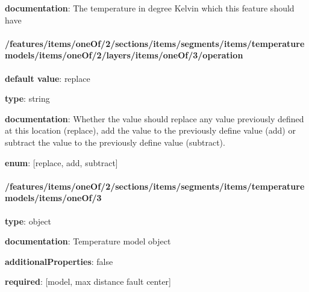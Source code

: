 \begin{itemized}
\item {\bf documentation}: The temperature in degree Kelvin which this feature should have
\end{itemized}\paragraph{/features/items/oneOf/2/sections/items/segments/items/temperature models/items/oneOf/2/layers/items/oneOf/3/operation} \begin{itemized}
\item {\bf default value}: replace
\item {\bf type}: string
\item {\bf documentation}: Whether the value should replace any value previously defined at this location (replace), add the value to the previously define value (add) or subtract the value to the previously define value (subtract).
\item {\bf enum}: [replace, add, subtract]\end{itemized}\paragraph{/features/items/oneOf/2/sections/items/segments/items/temperature models/items/oneOf/3} \begin{itemized}
\item {\bf type}: object
\item {\bf documentation}: Temperature model object
\item {\bf additionalProperties}: false
\item {\bf required}: [model, max distance fault center]\end{itemized}
